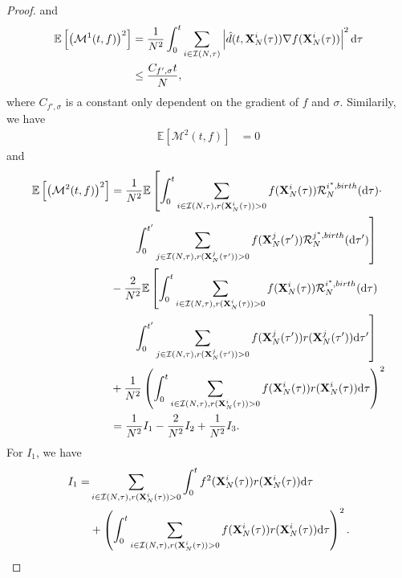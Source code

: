 \documentclass[preprint,12pt]{elsarticle}
\theoremstyle{definition}
\theoremstyle{remark}
\begin{document}
\begin{proof}
and
\begin{equation}
\begin{aligned}
    \mathbb E\left[ \left(\mathcal M^1(t,f) \right)^2\right] &= \frac{1}{N^2} \int_0^t \sum_{i\in \mathcal I(N,\tau)}  \left|\hat d(t,\mathbf{X}^i_N(\tau))\nabla f(\mathbf{X}_N^i(\tau))\right|^2 \mathrm{d} \tau \\
    & \leq \frac{C_{f',\sigma}t}{N},
\end{aligned}
\end{equation}
where $C_{f',\sigma}$ is a constant only dependent on the gradient of $f$ and $\sigma$. Similarily, we have
\begin{equation}
\begin{aligned}
    \mathbb E\left[ \mathcal M^2(t,f) \right] &= 0
\end{aligned}
\end{equation}
and 
\begin{equation*}
    \begin{aligned}
       \mathbb E\left[ \left(\mathcal M^2(t,f) \right)^2\right] &= \frac{1}{N^2}  \mathbb E\left[ \int_0^t \sum_{i\in \mathcal I(N,\tau), r(\mathbf{X}^i_N(\tau))>0}  f(\mathbf{X}_N^i(\tau))\mathcal R_N^{i^*,birth}(\mathrm{d} \tau) \cdot\right.\\
    & \qquad \left.\int_0^{t'} \sum_{j\in \mathcal I(N,\tau), r(\mathbf{X}^j_N(\tau'))>0}  f(\mathbf{X}_N^j(\tau'))\mathcal R_N^{j^*,birth}(\mathrm{d} \tau')\right]\\
       & - \frac{2}{N^2} \mathbb E\left[\int_0^t \sum_{i\in \mathcal I(N,\tau), r(\mathbf{X}^i_N(\tau))>0}  f(\mathbf{X}_N^i(\tau))\mathcal R_N^{i^*,birth}(\mathrm{d} \tau)\right.\\
    & \qquad \left.\int_0^{t'} \sum_{j\in \mathcal I(N,\tau), r(\mathbf{X}^j_N(\tau'))>0}  f(\mathbf{X}_N^j(\tau'))r(\mathbf{X}_N^j(\tau'))\mathrm{d} \tau'\right]\\
       & + \frac{1}{N^2} \left(\int_0^{t} \sum_{i\in \mathcal I(N,\tau), r(\mathbf{X}^i_N(\tau))>0}  f(\mathbf{X}_N^i(\tau))r(\mathbf{X}_N^i(\tau))\mathrm{d} \tau\right)^2\\
       & = \frac{1}{N^2}I_1-\frac{2}{N^2}I_2+\frac{1}{N^2}I_3.
    \end{aligned}
\end{equation*}
For $I_1$, we have 
\begin{equation*}
    \begin{aligned}
        I_1 =& \sum_{i\in \mathcal I(N,\tau), r(\bX^i_N(\tau))>0}\int_0^{t}f^2(\bX_N^i(\tau))r(\bX_N^i(\tau)) \intd \tau\\
        &+\left(\int_0^{t} \sum_{i\in \mathcal I(N,\tau), r(\bX^i_N(\tau))>0}  f(\bX_N^i(\tau))r(\bX_N^i(\tau))\intd \tau\right)^2.

\end{aligned}
\end{equation*}
\end{proof}
\end{document}
